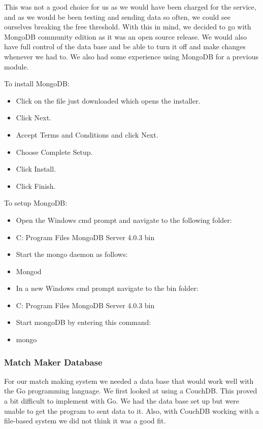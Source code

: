 This was not a good choice for us as we would have been charged for the service, and as we would be been testing and sending data so often, we could see ourselves breaking the free threshold. With this in mind, we decided to go with MongoDB community edition as it was an open source release. We would also have full control of the data base and be able to turn it off and make changes whenever we had to. We also had some experience using MongoDB for a previous module.
\newline

To install MongoDB:
\begin{itemize}
\item Click on the file just downloaded which opens the installer.
\item Click Next.
\item Accept Terms and Conditions and click Next.
\item Choose Complete Setup.
\item Click Install.
\item Click Finish.
\end{itemize}
\newline

To setup MongoDB:
\begin{itemize}
\item Open the Windows cmd prompt and navigate to the following folder:
\item C: Program Files MongoDB Server 4.0.3 bin 
\item Start the mongo daemon as follows:
\item Mongod
\item In a new Windows cmd prompt  navigate to the bin folder:
\item C: Program Files MongoDB Server 4.0.3 bin
\item Start mongoDB by entering this command:
\item	mongo
\end{itemize}
\newline
\subsubsection{Match Maker Database}
For our match making system we needed a data base that would work well with the Go programming language. We first looked at using a CouchDB. This proved a bit difficult to implement with Go. We had the data base set up but were unable to get the program to sent data to it. Also, with CouchDB working with a file-based system we did not think it was a good fit.
\newline

